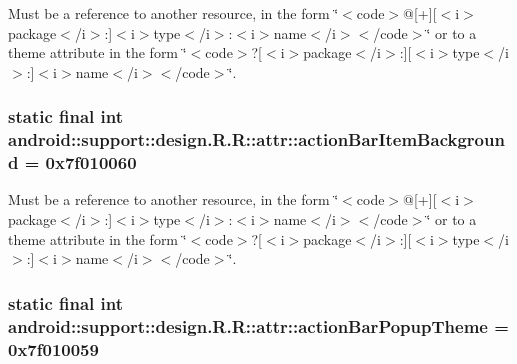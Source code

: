 Must be a reference to another resource, in the form \char`\"{}$<$code$>$@\mbox{[}+\mbox{]}\mbox{[}$<$i$>$package$<$/i$>$:\mbox{]}$<$i$>$type$<$/i$>$:$<$i$>$name$<$/i$>$$<$/code$>$\char`\"{} or to a theme attribute in the form \char`\"{}$<$code$>$?\mbox{[}$<$i$>$package$<$/i$>$:\mbox{]}\mbox{[}$<$i$>$type$<$/i$>$:\mbox{]}$<$i$>$name$<$/i$>$$<$/code$>$\char`\"{}. \hypertarget{classandroid_1_1support_1_1design_1_1_r_1_1attr_4bf92863f3d9d3a9d37794e874b771bd}{
\subsubsection[{actionBarItemBackground}]{\setlength{\rightskip}{0pt plus 5cm}static final int android::support::design.R.R::attr::actionBarItemBackground = 0x7f010060}}
\label{classandroid_1_1support_1_1design_1_1_r_1_1attr_4bf92863f3d9d3a9d37794e874b771bd}


Must be a reference to another resource, in the form \char`\"{}$<$code$>$@\mbox{[}+\mbox{]}\mbox{[}$<$i$>$package$<$/i$>$:\mbox{]}$<$i$>$type$<$/i$>$:$<$i$>$name$<$/i$>$$<$/code$>$\char`\"{} or to a theme attribute in the form \char`\"{}$<$code$>$?\mbox{[}$<$i$>$package$<$/i$>$:\mbox{]}\mbox{[}$<$i$>$type$<$/i$>$:\mbox{]}$<$i$>$name$<$/i$>$$<$/code$>$\char`\"{}. \hypertarget{classandroid_1_1support_1_1design_1_1_r_1_1attr_97afefd60d393fb0fb2f5f019514bccf}{
\subsubsection[{actionBarPopupTheme}]{\setlength{\rightskip}{0pt plus 5cm}static final int android::support::design.R.R::attr::actionBarPopupTheme = 0x7f010059}}
\label{classandroid_1_1support_1_1design_1_1_r_1_1attr_97afefd60d393fb0fb2f5f019514bccf}


